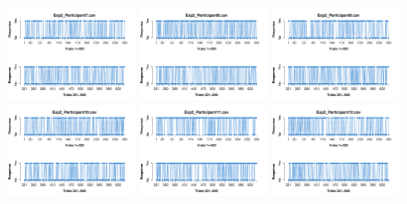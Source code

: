 \begin{itemize}
\begin{figure}[th]
\includegraphics[width=0.30\textwidth]{Figures/Response_Exp2_P7} \includegraphics[width=0.30\textwidth]{Figures/Response_Exp2_P8} \includegraphics[width=0.30\textwidth]{Figures/Response_Exp2_P9}
\includegraphics[width=0.30\textwidth]{Figures/Response_Exp2_P10} \includegraphics[width=0.30\textwidth]{Figures/Response_Exp2_P11} \includegraphics[width=0.30\textwidth]{Figures/Response_Exp2_P12}

\end{figure}
\end{itemize}
